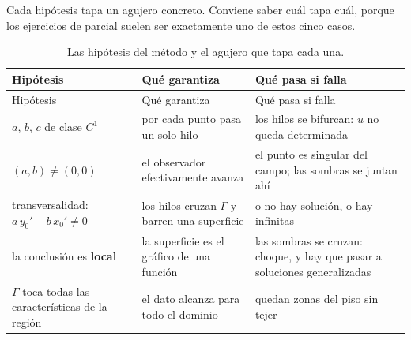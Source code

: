 \documentclass[
  spanish,
  a4paper,
]{scrbook}
\theoremstyle{definition}
\theoremstyle{plain}
\theoremstyle{definition}
\theoremstyle{plain}
\theoremstyle{definition}
\theoremstyle{remark}
\begin{document}
Cada hipótesis tapa un agujero concreto. Conviene saber cuál tapa cuál,
porque los ejercicios de parcial suelen ser exactamente uno de estos
cinco casos.

\begin{longtable}[]{@{}
  >{\raggedright\arraybackslash}p{}
  >{\raggedright\arraybackslash}p{}
  >{\raggedright\arraybackslash}p{}@{}}
\caption{Las hipótesis del método y el agujero que tapa cada
una.}\tabularnewline
\toprule\noalign{}
\begin{minipage}[b]{\linewidth}\raggedright
Hipótesis
\end{minipage} & \begin{minipage}[b]{\linewidth}\raggedright
Qué garantiza
\end{minipage} & \begin{minipage}[b]{\linewidth}\raggedright
Qué pasa si falla
\end{minipage} \\
\midrule\noalign{}
\endfirsthead
\toprule\noalign{}
\begin{minipage}[b]{\linewidth}\raggedright
Hipótesis
\end{minipage} & \begin{minipage}[b]{\linewidth}\raggedright
Qué garantiza
\end{minipage} & \begin{minipage}[b]{\linewidth}\raggedright
Qué pasa si falla
\end{minipage} \\
\midrule\noalign{}
\endhead
\bottomrule\noalign{}
\endlastfoot
\(a\), \(b\), \(c\) de clase \(C^1\) & por cada punto pasa un solo hilo
& los hilos se bifurcan: \(u\) no queda determinada \\
\((a,b) \neq (0,0)\) & el observador efectivamente avanza & el punto es
singular del campo; las sombras se juntan ahí \\
transversalidad: \(a\,y_0' - b\,x_0' \neq 0\) & los hilos cruzan
\(\Gamma\) y barren una superficie & o no hay solución, o hay
infinitas \\
la conclusión es \textbf{local} & la superficie es el gráfico de una
función & las sombras se cruzan: choque, y hay que pasar a soluciones
generalizadas \\
\(\Gamma\) toca todas las características de la región & el dato alcanza
para todo el dominio & quedan zonas del piso sin tejer \\
\end{longtable}
\end{document}
